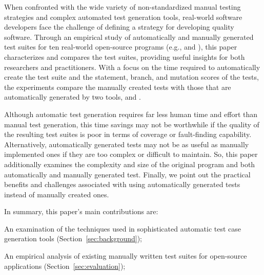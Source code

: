 
When confronted with the wide variety of non-standardized manual testing strategies and complex automated test generation tools, real-world software developers face the challenge of defining a strategy for developing quality software.  Through an empirical study of automatically and manually generated test suites for ten real-world open-source programs (e.g., \netweaver and  \jsecurity), this paper characterizes and compares the test suites, providing useful insights for both researchers and practitioners. With a focus on the time required to automatically create the test suite and the statement, branch, and mutation scores of the tests, the experiments compare the manually created tests with those that are automatically generated by two tools, \codepro and \evo.  


Although automatic test generation requires far less human time and effort than manual test generation, this time savings may not be worthwhile if the quality of the resulting test suites is poor in terms of coverage or fault-finding capability.  Alternatively, automatically generated tests may not be as useful as manually implemented ones if they are too complex or difficult to maintain.  So, this paper additionally examines the complexity and size of the original program and both automatically and manually generated test.  Finally, we point out the practical benefits and challenges associated with using automatically generated tests instead of manually created ones.





In summary, this paper's main contributions are:
\squishlist 
\item An examination of the techniques used in sophisticated automatic test case generation tools (Section~\ref{sec:background});

\item An empirical analysis of existing manually written test suites for open-source applications (Section~\ref{sec:evaluation});

